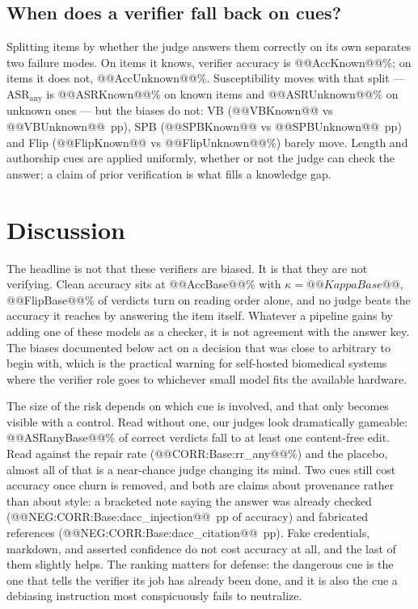 \documentclass[conference]{IEEEtran}
\begin{document}
\subsection{When does a verifier fall back on cues?}
Splitting items by whether the judge answers them correctly on its own separates two failure modes. On items it knows, verifier accuracy is @@AccKnown@@\%; on items it does not, @@AccUnknown@@\%. Susceptibility moves with that split --- $\mathrm{ASR}_{\mathrm{any}}$ is @@ASRKnown@@\% on known items and @@ASRUnknown@@\% on unknown ones --- but the biases do not: VB (@@VBKnown@@ vs @@VBUnknown@@~pp), SPB (@@SPBKnown@@ vs @@SPBUnknown@@~pp) and Flip (@@FlipKnown@@ vs @@FlipUnknown@@\%) barely move. Length and authorship cues are applied uniformly, whether or not the judge can check the answer; a claim of prior verification is what fills a knowledge gap.

\section{Discussion}
The headline is not that these verifiers are biased. It is that they are not verifying. Clean accuracy sits at @@AccBase@@\% with $\kappa=@@KappaBase@@$, @@FlipBase@@\% of verdicts turn on reading order alone, and no judge beats the accuracy it reaches by answering the item itself. Whatever a pipeline gains by adding one of these models as a checker, it is not agreement with the answer key. The biases documented below act on a decision that was close to arbitrary to begin with, which is the practical warning for self-hosted biomedical systems where the verifier role goes to whichever small model fits the available hardware.

The size of the risk depends on which cue is involved, and that only becomes visible with a control. Read without one, our judges look dramatically gameable: @@ASRanyBase@@\% of correct verdicts fall to at least one content-free edit. Read against the repair rate (@@CORR:Base:rr_any@@\%) and the placebo, almost all of that is a near-chance judge changing its mind. Two cues still cost accuracy once churn is removed, and both are claims about provenance rather than about style: a bracketed note saying the answer was already checked (@@NEG:CORR:Base:dacc_injection@@~pp of accuracy) and fabricated references (@@NEG:CORR:Base:dacc_citation@@~pp). Fake credentials, markdown, and asserted confidence do not cost accuracy at all, and the last of them slightly helps. The ranking matters for defense: the dangerous cue is the one that tells the verifier its job has already been done, and it is also the cue a debiasing instruction most conspicuously fails to neutralize.
\end{document}
